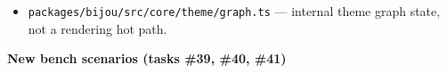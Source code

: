 \begin{itemize}
  \texttt{p\allowbreak{}a\allowbreak{}c\allowbreak{}k\allowbreak{}a\allowbreak{}g\allowbreak{}e\allowbreak{}s\allowbreak{}/\allowbreak{}b\allowbreak{}i\allowbreak{}j\allowbreak{}o\allowbreak{}u\allowbreak{}/\allowbreak{}s\allowbreak{}r\allowbreak{}c\allowbreak{}/\allowbreak{}c\allowbreak{}o\allowbreak{}r\allowbreak{}e\allowbreak{}/\allowbreak{}c\allowbreak{}o\allowbreak{}m\allowbreak{}p\allowbreak{}o\allowbreak{}n\allowbreak{}e\allowbreak{}n\allowbreak{}t\allowbreak{}s\allowbreak{}/\allowbreak{}b\allowbreak{}o\allowbreak{}x\allowbreak{}-\allowbreak{}v\allowbreak{}3\allowbreak{}.\allowbreak{}t\allowbreak{}s} --- already has a \texttt{s\allowbreak{}e\allowbreak{}t\allowbreak{}R\allowbreak{}G\allowbreak{}B} fast path for packed surfaces. The \texttt{s\allowbreak{}u\allowbreak{}r\allowbreak{}f\allowbreak{}a\allowbreak{}c\allowbreak{}e\allowbreak{}.\allowbreak{}s\allowbreak{}e\allowbreak{}t} fallback only runs on non-packed surfaces which don't exist anymore.
\item
  \texttt{p\allowbreak{}a\allowbreak{}c\allowbreak{}k\allowbreak{}a\allowbreak{}g\allowbreak{}e\allowbreak{}s\allowbreak{}/\allowbreak{}b\allowbreak{}i\allowbreak{}j\allowbreak{}o\allowbreak{}u\allowbreak{}/\allowbreak{}s\allowbreak{}r\allowbreak{}c\allowbreak{}/\allowbreak{}c\allowbreak{}o\allowbreak{}r\allowbreak{}e\allowbreak{}/\allowbreak{}t\allowbreak{}h\allowbreak{}e\allowbreak{}m\allowbreak{}e\allowbreak{}/\allowbreak{}g\allowbreak{}r\allowbreak{}a\allowbreak{}p\allowbreak{}h\allowbreak{}.\allowbreak{}t\allowbreak{}s} --- internal theme graph state, not a rendering hot path.
\end{itemize}

\textbf{New bench scenarios (tasks \#39, \#40, \#41)}

